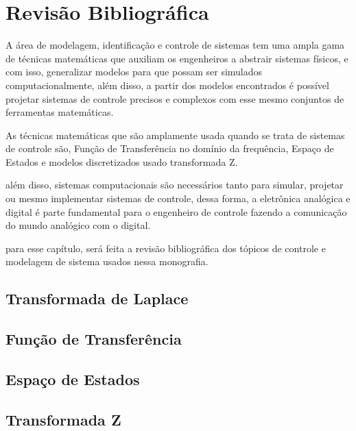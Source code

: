 \chapter{Revisão Bibliográfica}

A área de modelagem, identificação e controle de sistemas tem uma ampla gama de técnicas matemáticas que auxiliam os engenheiros a abstrair sistemas físicos, e com isso, generalizar modelos para que possam ser simulados computacionalmente, além disso, a partir dos modelos encontrados é possível projetar sistemas de controle precisos e complexos com esse mesmo conjuntos de ferramentas matemáticas.

As técnicas matemáticas que são amplamente usada quando se trata de sistemas de controle são, Função de Transferência no domínio da frequência, Espaço de Estados e modelos discretizados usado transformada Z.

além disso, sistemas computacionais são necessários tanto para simular, projetar ou mesmo implementar sistemas de controle, dessa forma, a eletrônica analógica e digital é parte fundamental para o engenheiro de controle fazendo a comunicação do mundo analógico com o digital.

para esse capítulo, será feita a revisão bibliográfica dos tópicos de controle e modelagem de sistema usados 
nessa monografia. 

\section{Transformada de Laplace}

\section{Função de Transferência}

\section{Espaço de Estados}

\section{Transformada Z}

